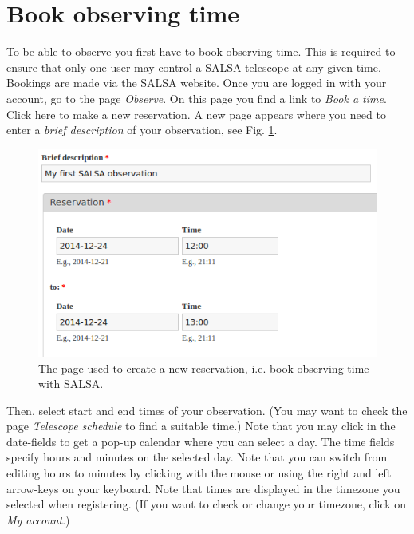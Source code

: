 \section{Book observing time}
To be able to observe you first have to book observing time. This is required
to ensure that only one user may control a SALSA telescope at any given time.
Bookings are made via the SALSA website. Once you are logged in with your
account, go to the page \emph{Observe}. On this page you find a link to
\emph{Book a time}. Click here to make a new reservation.  A new
page appears where you need to enter a \emph{brief description} of your
observation, see Fig. \ref{fig:book}.
\begin{figure}[h]
\centering
\includegraphics[width=\textwidth]{../figures/SALSA_book.png}
\caption{\label{fig:book} The page used to create a new reservation, i.e.
	book observing time with SALSA.}
\end{figure}

Then, select start and end times of your observation. (You may want to check
the page \emph{Telescope schedule} to find a suitable time.)  Note that you may
click in the date-fields to get a pop-up calendar where you can select a day.
The time fields specify hours and minutes on the selected day. Note that you
can switch from editing hours to minutes by clicking with the mouse or using
the right and left arrow-keys on your keyboard. Note that times are displayed
in the timezone you selected when registering. (If you want to check or change
your timezone, click on \emph{My account}.)

